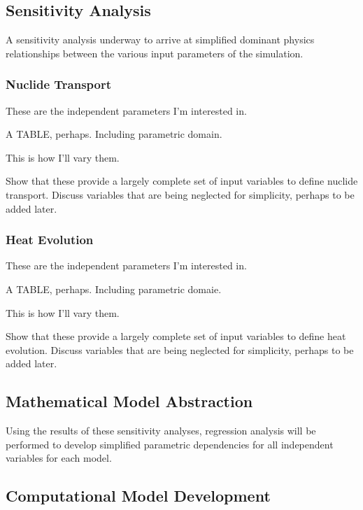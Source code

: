 




\subsection{Sensitivity Analysis}

A sensitivity analysis underway to arrive at simplified dominant physics 
relationships between the various input parameters of the simulation. 

\subsubsection{Nuclide Transport}

These are the independent parameters I'm interested in.

A TABLE, perhaps. Including parametric domain.

This is how I'll vary them.

Show that these provide a largely complete set of input variables to define 
nuclide transport. Discuss variables that are being neglected for simplicity, 
perhaps to be added later. 

\subsubsection{Heat Evolution}

These are the independent parameters I'm interested in.

A TABLE, perhaps. Including parametric domaie.

This is how I'll vary them.

Show that these provide a largely complete set of input variables to define heat 
evolution. Discuss variables that are being neglected for simplicity, perhaps to 
be added later. 

\subsection{Mathematical Model Abstraction}

Using the results of these sensitivity analyses, regression analysis will be 
performed to develop simplified parametric dependencies for all independent 
variables for each model. 

\subsection{Computational Model Development}

